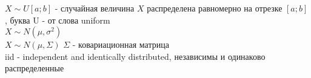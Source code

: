 
$X\sim U[a;b]$ - случайная величина $X$ распределена равномерно на
отрезке $[a;b]$, буква U - от слова uniform \\
$X\sim N(\mu,\sigma^{2})$ \\
$X\sim N(\mu,\Sigma)$ $\Sigma$ - ковариационная матрица \\
iid - independent and identically distributed, независимы и
одинаково распределенные \\

